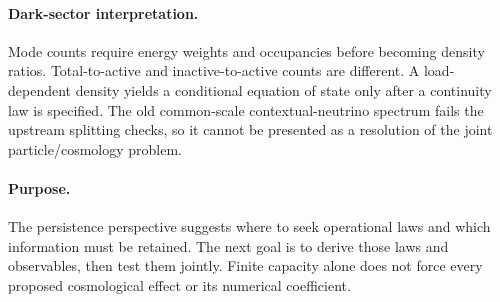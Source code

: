 \paragraph{Dark-sector interpretation.}
Mode counts require energy weights and occupancies before becoming density ratios. Total-to-active and inactive-to-active counts are different. A load-dependent density yields a conditional equation of state only after a continuity law is specified. The old common-scale contextual-neutrino spectrum fails the upstream splitting checks, so it cannot be presented as a resolution of the joint particle/cosmology problem.

\paragraph{Purpose.}
The persistence perspective suggests where to seek operational laws and which information must be retained. The next goal is to derive those laws and observables, then test them jointly. Finite capacity alone does not force every proposed cosmological effect or its numerical coefficient.
